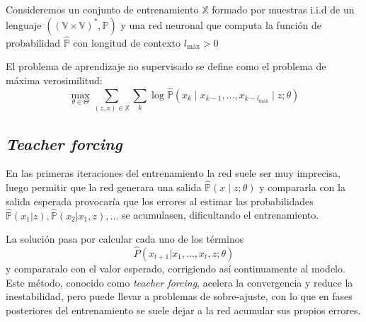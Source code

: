 \begin{definition}
    Consideremos un conjunto de entrenamiento \( \mathbb{X} \) formado por muestras i.i.d de un lenguaje \( ((\mathbb{V} × \mathbb{V})^*, \mathbb{P}) \) y una red neuronal que computa la función de probabilidad \( \widehat{\mathbb{P}} \) con longitud de contexto \( l_\text{máx} > 0 \)
    
    El problema de aprendizaje no supervisado se define como el problema de máxima verosimilitud:
    \begin{equation} \label{eq:unsupervised}
        \max_{\theta \in \Theta} \sum_{(z, x) \in \mathbb{X}} \sum_k \log \widehat{\mathbb{P}} \left(x_{k} \mid x_{k-1}, …, x_{k-l_\text{máx}} \mid z; \theta \right)
    \end{equation}
\end{definition}

\subsection{\textit{Teacher forcing}}
En las primeras iteraciones del entrenamiento la red suele ser muy imprecisa, luego permitir que la red generara una salida \( \widehat{\mathbb{P}}(x \mid z; \theta) \) y compararla con la salida esperada provocaría que los errores al estimar las probabilidades \( \widehat{\mathbb{P}}(x_1 | z), \widehat{\mathbb{P}}(x_2 | x_1, z), \ldots \) se acumulasen, dificultando el entrenamiento. 

La solución pasa por calcular cada uno de los términos
\[
    \widehat{P}(x_{t+1} | x_1, \ldots, x_t, z; \theta)
\]
y compararalo con el valor esperado, corrigiendo así continuamente al modelo. Este método, conocido como \textit{teacher forcing}, acelera la convergencia y reduce la inestabilidad, pero puede llevar a problemas de sobre-ajuste, con lo que en fases posteriores del entrenamiento se suele dejar a la red acumular sus propios errores.